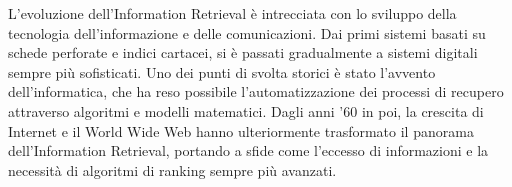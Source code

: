 L'evoluzione dell'Information Retrieval è intrecciata con lo sviluppo della tecnologia dell'informazione e delle comunicazioni. Dai primi sistemi basati su schede perforate e indici cartacei, si è passati gradualmente a sistemi digitali sempre più sofisticati. Uno dei punti di svolta storici è stato l'avvento dell'informatica, che ha reso possibile l'automatizzazione dei processi di recupero attraverso algoritmi e modelli matematici. Dagli anni '60 in poi, la crescita di Internet e il World Wide Web hanno ulteriormente trasformato il panorama dell'Information Retrieval, portando a sfide come l'eccesso di informazioni e la necessità di algoritmi di ranking sempre più avanzati.